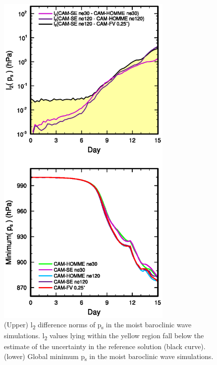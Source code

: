 \begin{figure}[h]
\centering
\includegraphics[width=20pc]{figs/temp_l2_reference.eps}
\caption{(Upper) l\textsubscript{2} difference norms of p\textsubscript{s} in the moist baroclinic wave simulations. l\textsubscript{2} values lying within the yellow region fall below the estimate of the uncertainty in the reference solution (black curve). (lower) Global minimum p\textsubscript{s} in the moist baroclinic wave simulations.}
\label{fig:l2norm}
\end{figure}
